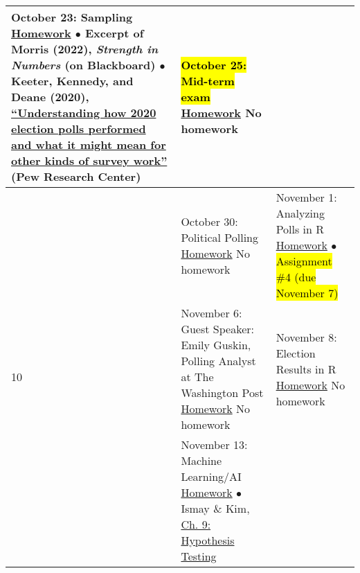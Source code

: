 \documentclass[12pt,letterpaper]{article}
\begin{document}
\begin{tabularx}{\textwidth}{|p{}|p{}||p{}|}
October 23: Sampling \newline \newline
\ul{Homework} \newline
$\bullet$ Excerpt of Morris (2022), \emph{Strength in Numbers} (on Blackboard) \newline
$\bullet$ Keeter, Kennedy, and Deane (2020), \href{https://www.pewresearch.org/fact-tank/2020/11/13/understanding-how-2020s-election-polls-performed-and-what-it-might-mean-for-other-kinds-of-survey-work/}{``Understanding how 2020 election polls performed and what it might mean for other kinds of survey work''} (Pew Research Center) &

\hl{October 25: Mid-term exam} \newline \newline
\ul{Homework} \newline
No homework \\


\hline
\multirow{6}{*}{10} &

October 30: Political Polling \newline \newline
\ul{Homework} \newline
No homework &

November 1: Analyzing Polls in R \newline \newline
\ul{Homework} \newline
$\bullet$ \hl{Assignment \#4 (due November 7)}\\


\hline
\multirow{6}{*}{11} &

November 6: Guest Speaker: Emily Guskin, Polling Analyst at The Washington Post \newline \newline
\ul{Homework} \newline
No homework &

November 8: Election Results in R \newline \newline
\ul{Homework} \newline
No homework\\


\hline
\multirow{6}{*}{12} &

November 13: Machine Learning/AI \newline \newline
\ul{Homework} \newline
$\bullet$ Ismay \& Kim, \href{https://moderndive.com/9-hypothesis-testing.html}{Ch. 9: Hypothesis Testing} &


\end{tabularx}
\end{document}
